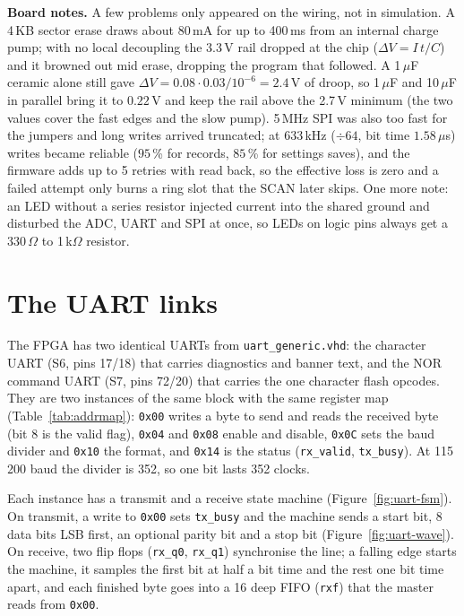 \documentclass[a4paper,10pt]{article}
\begin{document}
\textbf{Board notes.} A few problems only appeared on the wiring, not in simulation. A
4\,KB sector erase draws about $80$\,mA for up to 400\,ms from an internal charge pump;
with no local decoupling the 3.3\,V rail dropped at the chip ($\Delta V = I\,t/C$) and it
browned out mid erase, dropping the program that followed. A 1\,$\mu$F ceramic alone still
gave $\Delta V = 0.08\cdot0.03/10^{-6} = 2.4$\,V of droop, so 1\,$\mu$F and 10\,$\mu$F in
parallel bring it to $0.22$\,V and keep the rail above the 2.7\,V minimum (the two values
cover the fast edges and the slow pump). 5\,MHz SPI was also too fast for the jumpers and
long writes arrived truncated; at 633\,kHz ($\div64$, bit time $1.58\,\mu$s) writes became
reliable ($95$\,\% for records, $85$\,\% for settings saves), and the firmware adds up to
5 retries with read back, so the effective loss is zero and a failed attempt only burns a
ring slot that the SCAN later skips. One more note: an LED without a series resistor
injected current into the shared ground and disturbed the ADC, UART and SPI at once, so
LEDs on logic pins always get a 330\,$\Omega$ to 1\,k$\Omega$ resistor.

\section{The UART links}
\label{sec:uart}

The FPGA has two identical UARTs from \texttt{uart\_generic.vhd}: the character UART (S6,
pins 17/18) that carries diagnostics and banner text, and the NOR command UART (S7, pins
72/20) that carries the one character flash opcodes. They are two instances of the same
block with the same register map (Table~\ref{tab:addrmap}): \texttt{0x00} writes a byte to
send and reads the received byte (bit 8 is the valid flag), \texttt{0x04} and \texttt{0x08}
enable and disable, \texttt{0x0C} sets the baud divider and \texttt{0x10} the format, and
\texttt{0x14} is the status (\texttt{rx\_valid}, \texttt{tx\_busy}). At 115\,200 baud the
divider is 352, so one bit lasts 352 clocks.

Each instance has a transmit and a receive state machine (Figure~\ref{fig:uart-fsm}). On
transmit, a write to \texttt{0x00} sets \texttt{tx\_busy} and the machine sends a start
bit, 8 data bits LSB first, an optional parity bit and a stop bit
(Figure~\ref{fig:uart-wave}). On receive, two flip flops (\texttt{rx\_q0},
\texttt{rx\_q1}) synchronise the line; a falling edge starts the machine, it samples the
first bit at half a bit time and the rest one bit time apart, and each finished byte goes
into a 16 deep FIFO (\texttt{rxf}) that the master reads from \texttt{0x00}.
\end{document}

